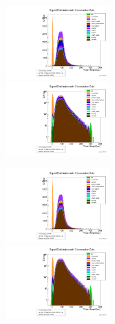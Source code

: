 \documentclass[9pt]{beamer}
\begin{document}
\begin{frame}
	\begin{minipage}{5.5cm}
		\centering
		\includegraphics[angle=270, width=4cm]{consecutive396}\\
		\includegraphics[angle=270, width=4cm]{consecutive_logy396}
	\end{minipage}
	\hspace*{2pt}
	\begin{minipage}{5.5cm}
		\centering
		\includegraphics[angle=270, width=4cm]{consecutive396a}\\
		\includegraphics[angle=270, width=4cm]{consecutive_logy396a}
	\end{minipage}\s
\end{frame}
\end{document}
